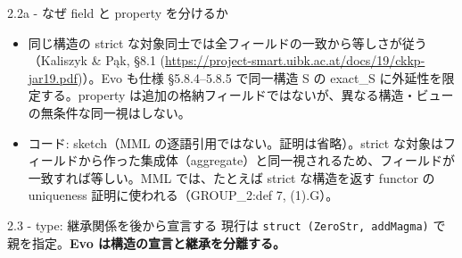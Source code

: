 \documentclass[dvipdfmx,aspectratio=169,11pt]{beamer}
\begin{document}
\begin{frame}[fragile,t]{2.2a - なぜ field と property を分けるか}
{\begin{itemize}
\item 同じ構造の strict な対象同士では全フィールドの一致から等しさが従う（Kaliszyk \& P\k{a}k, §8.1 (\url{https://project-smart.uibk.ac.at/docs/19/ckkp-jar19.pdf})）。Evo も仕様 §5.8.4–5.8.5 で同一構造 S の exact\_S に外延性を限定する。property は追加の格納フィールドではないが、異なる構造・ビューの無条件な同一視はしない。
\item コード: sketch（MML の逐語引用ではない。証明は省略）。strict な対象はフィールドから作った集成体（aggregate）と同一視されるため、フィールドが一致すれば等しい。MML では、たとえば strict な構造を返す functor の uniqueness 証明に使われる（GROUP\_2:def 7, (1).G）。
\end{itemize}
}
\end{frame}

\begin{frame}[fragile,t]{2.3 - type: 継承関係を後から宣言する}
現行は \texttt{struct (ZeroStr, addMagma)} で親を指定。\textcolor{blue!55!black}{\textbf{Evo は構造の宣言と継承を分離する。}}


\end{frame}
\end{document}
